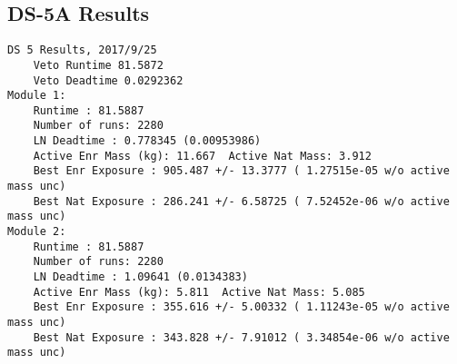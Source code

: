\documentclass[notitlepage,rmp,aps,10pt]{revtex4-1}
\begin{document}
\subsection{DS-5A Results}
\begin{verbatim}
DS 5 Results, 2017/9/25
	Veto Runtime 81.5872
	Veto Deadtime 0.0292362
Module 1:
	Runtime : 81.5887
	Number of runs: 2280
	LN Deadtime : 0.778345 (0.00953986)
	Active Enr Mass (kg): 11.667  Active Nat Mass: 3.912
	Best Enr Exposure : 905.487 +/- 13.3777 ( 1.27515e-05 w/o active mass unc)
	Best Nat Exposure : 286.241 +/- 6.58725 ( 7.52452e-06 w/o active mass unc)
Module 2:
	Runtime : 81.5887
	Number of runs: 2280
	LN Deadtime : 1.09641 (0.0134383)
	Active Enr Mass (kg): 5.811  Active Nat Mass: 5.085
	Best Enr Exposure : 355.616 +/- 5.00332 ( 1.11243e-05 w/o active mass unc)
	Best Nat Exposure : 343.828 +/- 7.91012 ( 3.34854e-06 w/o active mass unc)


\end{verbatim}
\end{document}
